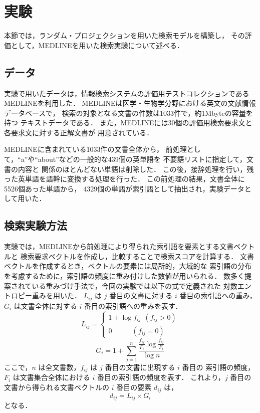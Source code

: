 \section{実験}
本節では，ランダム・プロジェクションを用いた検索モデルを構築し，
その評価として，MEDLINEを用いた検索実験について述べる．

\subsection{データ}
実験で用いたデータは，情報検索システムの評価用テストコレクションである 
MEDLINEを利用した．
MEDLINEは医学・生物学分野における英文の文献情報データベースで，
検索の対象となる文書の件数は1033件で，約1Mbyteの容量を持つ
テキストデータである．
また，MEDLINEには30個の評価用検索要求文と各要求文に対する正解文書が
用意されている．

MEDLINEに含まれている1033件の文書全体から，
前処理として，``a''や``about''などの一般的な439個の英単語を
不要語リストに指定して，文書の内容と
関係のほとんどない単語は削除した．
この後，接辞処理を行い，残った英単語を語幹に変換する処理を行った．
この前処理の結果，文書全体に5526個あった単語から，
4329個の単語が索引語として抽出され，実験データとして用いた．

\subsection{検索実験方法}
実験では，MEDLINEから前処理により得られた索引語を要素とする文書ベクトルと
検索要求ベクトルを作成し，比較することで検索スコアを計算する．
文書ベクトルを作成するとき，ベクトルの要素には局所的，大域的な
索引語の分布を考慮するために，索引語の頻度に重み付けした数値が用いられる．
数多く提案されている重みづけ手法で，今回の実験では以下の式で定義された
対数エントロピー重み\cite{chisholm}を用いた．
$L_{ij}$ は $j$ 番目の文書に対する $i$ 番目の索引語への重み，
$G_i$ は文書全体に対する $i$ 番目の索引語への重みを表す．
\begin{equation}
L_{ij} = 
\left\{
\begin{array}{l}
1 + \log f_{ij} \ \ ( f_{ij} > 0 ) \\
0 \ \ \ \ \ \ \ \ \ \ \ \ \ ( f_{ij} = 0 )
\end{array}
\right.
\end{equation}
\begin{equation}
G_i = 1 + \sum_{j = 1}^{n} \frac{\frac{f_{ij}}{F_i} \log 
\frac{f_{ij}}{F_i}}{\log n}
\end{equation}
ここで，$n$ は全文書数，$f_{ij}$ は $j$ 番目の文書に出現する $i$ 番目の
索引語の頻度，$F_i$ は文書集合全体における $i$ 番目の索引語の頻度を表す．
これより，$j$ 番目の文書から得られる文書ベクトルの $i$ 番目の要素 $d_{ij}$ は，
\begin{equation}
d_{ij} = L_{ij} \times G_i
\end{equation}
となる．

